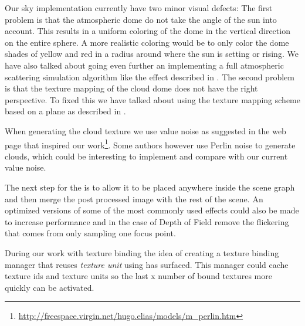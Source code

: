 Our sky implementation currently have two minor visual defects: The
first problem is that the atmospheric dome do not take the angle of
the sun into account. This results in a uniform coloring of the dome
in the vertical direction on the entire sphere. A more realistic
coloring would be to only color the dome shades of yellow and red in a
radius around where the sun is setting or rising.
%
We have also talked about going even further an implementing a full
atmospheric scattering simulation algorithm like the
effect described in .
%
The second problem is that the texture mapping of the cloud dome does
not have the right perspective.
To fixed this we have talked about using the texture mapping scheme
based on a plane as described in .

When generating the cloud texture we use value noise as suggested in
the web page that inspired our
work\footnote{\url{http://freespace.virgin.net/hugo.elias/models/m_perlin.htm}}.
Some authors however use Perlin noise to generate clouds, which could
be interesting to implement and compare with our current value noise.

The next step for the  is to allow it to be
placed anywhere inside the scene graph and then merge the post
processed image with the rest of the scene. An optimized versions of
some of the most commonly used effects could also be made to increase
performance and in the case of Depth of Field remove the flickering
that comes from only sampling one focus point.

During our work with texture binding the idea of creating a texture
binding manager that reuses \emph{texture unit} using
 has
surfaced. This manager could cache texture ids and texture units so
the last x number of bound textures more quickly can be activated.
